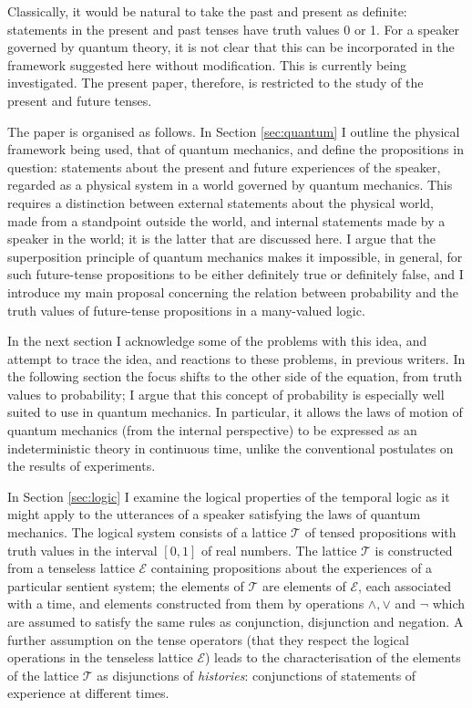 \documentclass[12pt,reqno]{article}
\renewcommand{\(}{\left(}
\renewcommand{\)}{\right)}
\newcommand{\E}{\mathcal{E}}
\newcommand{\T}{\mathcal{T}}
\newcommand{\<}{\langle}
\renewcommand{\>}{\rangle}
\theoremstyle{plain} %
\begin{document}
 Classically, it would be natural to take the past and present as definite: statements in the present and past tenses have truth values 0 or 1. For a speaker governed by quantum theory, it is not clear that this can be incorporated in the framework suggested here without modification. This is currently being investigated. The present paper, therefore, is restricted to the study of the present and future tenses.


The paper is organised as follows. In Section \ref{sec:quantum} I outline the physical framework being used, that of quantum mechanics, and define the propositions in question: statements about the present and future experiences of the speaker, regarded as a physical system in a world governed by quantum mechanics. This requires a distinction between external statements about the physical world, made from a standpoint outside the world, and internal statements made by a speaker in the world; it is the latter that are discussed here. I argue that the superposition principle of quantum mechanics makes it impossible, in general, for such future-tense propositions to be either definitely true or definitely false, and I introduce my main proposal concerning the relation between probability and the truth values of future-tense propositions in a many-valued logic.  

In the next section I acknowledge some of the problems with this idea, and attempt to trace the idea, and reactions to these problems, in previous writers. In the following section the focus shifts to the other side of the equation, from truth values to probability; I argue that this concept of probability is especially well suited to use in quantum mechanics. In particular, it allows the laws of motion of quantum mechanics (from the internal perspective) to be expressed as an indeterministic theory in continuous time, unlike the conventional postulates on the results of experiments.

 In Section \ref{sec:logic} I examine the logical properties of the temporal logic as it might apply to the utterances of a speaker satisfying the laws of quantum mechanics. The logical system consists of a lattice $\T$ of tensed propositions with truth values in the interval $[0,1]$ of real numbers. The lattice $\T$ is constructed from a tenseless lattice $\E$ containing propositions about the experiences of a particular sentient system; the elements of $\T$ are elements of $\E$, each associated with a time, and elements constructed from them by operations $\land, \lor$ and $\lnot$ which are assumed to satisfy the same rules as conjunction, disjunction and negation. A further assumption on the tense operators (that they respect the logical operations in the tenseless lattice $\E$) leads to the characterisation of the elements of the lattice $\T$ as disjunctions of \emph{histories}: conjunctions of statements of experience at different times. 
\end{document}
